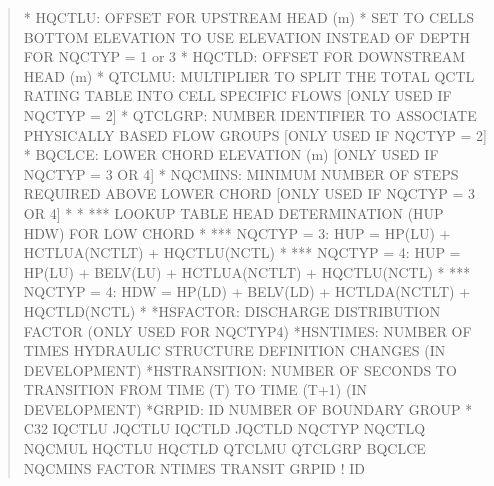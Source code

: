 \documentclass[letterpaper,10pt,english]{sphinxmanual}
\begin{document}
\begin{quote}
\begin{sphinxVerbatim}[commandchars=\\\{\}]
*  HQCTLU:      OFFSET FOR UPSTREAM HEAD (m)
*               SET TO CELL\PYGZsq{}S BOTTOM ELEVATION TO USE ELEVATION INSTEAD OF DEPTH FOR NQCTYP = \PYGZhy{}1 or 3
*  HQCTLD:      OFFSET FOR DOWNSTREAM HEAD (m)
*  QTCLMU:      MULTIPLIER TO SPLIT THE TOTAL QCTL RATING TABLE INTO CELL SPECIFIC FLOWS  [ONLY USED IF NQCTYP = \PYGZhy{}2]
*  QTCLGRP:     NUMBER IDENTIFIER TO ASSOCIATE PHYSICALLY BASED FLOW GROUPS               [ONLY USED IF NQCTYP = \PYGZhy{}2]
*  BQCLCE:      LOWER CHORD ELEVATION (m)                            [ONLY USED IF NQCTYP = 3 OR 4]
*  NQCMINS:     MINIMUM NUMBER OF STEPS REQUIRED ABOVE LOWER CHORD   [ONLY USED IF NQCTYP = 3 OR 4]
* 
*               *** LOOKUP TABLE HEAD DETERMINATION (HUP \PYGZam{} HDW) FOR LOW CHORD
*               *** NQCTYP = 3:  HUP = HP(LU) + HCTLUA(NCTLT) + HQCTLU(NCTL) 
*               *** NQCTYP = 4:  HUP = HP(LU) + BELV(LU) + HCTLUA(NCTLT) + HQCTLU(NCTL)
*               *** NQCTYP = 4:  HDW = HP(LD) + BELV(LD) + HCTLDA(NCTLT) + HQCTLD(NCTL)
* 
*HS\PYGZus{}FACTOR:     DISCHARGE DISTRIBUTION FACTOR  (ONLY USED FOR NQCTYP\PYGZgt{}4)
*HS\PYGZus{}NTIMES:     NUMBER OF TIMES HYDRAULIC STRUCTURE DEFINITION CHANGES       (IN DEVELOPMENT)
*HS\PYGZus{}TRANSITION: NUMBER OF SECONDS TO TRANSITION FROM TIME (T) TO TIME (T+1)  (IN DEVELOPMENT)
*GRPID:         ID NUMBER OF BOUNDARY GROUP
*
C32  IQCTLU  JQCTLU  IQCTLD  JQCTLD  NQCTYP  NQCTLQ  NQCMUL  HQCTLU  HQCTLD  QTCLMU QTCLGRP  BQCLCE NQCMINS  FACTOR  NTIMES  TRANSIT   GRPID ! ID
\end{sphinxVerbatim}
\end{quote}
\end{document}
